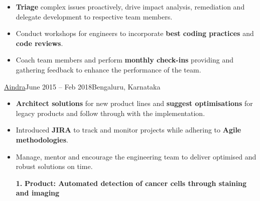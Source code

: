 \documentclass[10pt,a4paper,ragged2e,withhyper]{altacv}
\begin{document}
\begin{paracol}{2}
\begin{itemize}
\item \textbf{Triage} complex issues proactively, drive impact analysis, remediation and delegate development to respective team members.
\item Conduct workshops for engineers to incorporate \textbf{best coding practices} and \textbf{code reviews}.
\item Coach team members and perform \textbf{monthly check-ins} providing and gathering feedback to enhance the performance of the team.
\end{itemize}

\divider


{\href{https://www.aindra.in/}{Aindra}}{June 2015 – Feb 2018}{Bengaluru, Karnataka}
\begin{itemize}
\item \textbf{Architect solutions} for new product lines and \textbf{suggest optimisations} for legacy products and follow through with the implementation.
\item Introduced \textbf{JIRA} to track and monitor projects while adhering to \textbf{Agile methodologies}.
\item Manage, mentor and encourage the engineering team to deliver optimised and robust solutions on time.
\vspace{6pt}


\item[\textbf{1.}] \textbf{Product: Automated detection of cancer cells through staining and imaging}


\end{itemize}
\end{paracol}
\end{document}
